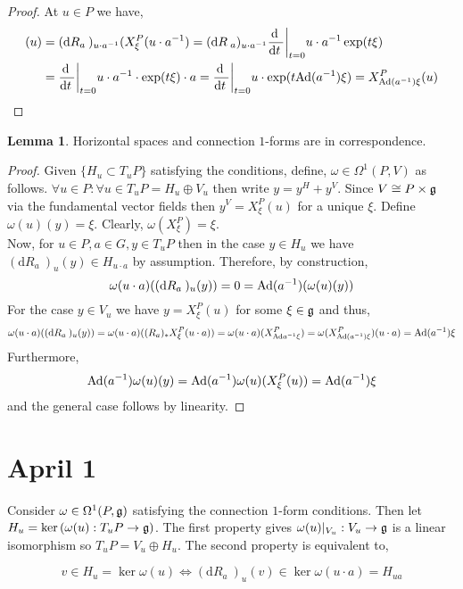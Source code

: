 \documentclass[12pt]{extarticle}
\renewcommand{\d}[1]{ \mathrm{d}#1 \:}
\newcommand{\deriv}[2]{\frac{\d{#1}}{\d{#2}}}
\theoremstyle{definition}
\newtheorem{lemma}[theorem]{Lemma}
\begin{document}
\begin{proof}
At $u \in P$ we have,
\begin{align*}
[(R_a)_* X^P_\xi](u) & = (\d{R_a})_{u \cdot a^{-1}}(X^P_\xi(u \cdot a^{-1}) = (\d{R}_a)_{u \cdot a^{-1}} \deriv{}{t} \bigg|_{t = 0} u \cdot a^{-1} \exp(t \xi)
\\
& = \deriv{}{t} \bigg|_{t = 0} u \cdot a^{-1} \cdot \exp(t \xi) \cdot a = \deriv{}{t} \bigg|_{t = 0} u \cdot \exp(t \Ad(a^{-1}) \xi) = X^P_{\Ad(a^{-1}) \xi}(u) 
\end{align*}
\end{proof}

\begin{lemma}
Horizontal spaces and connection $1$-forms are in correspondence.
\end{lemma}

\begin{proof}
Given $\{ H_u \subset T_u P \}$ satisfying the conditions, define, $\omega \in \Omega^1(P, V)$ as follows. $\forall u \in P : \forall u \in T_u P = H_u \oplus V_u$ then write $y = y^H + y^V$. Since $V \cong P \times \mathfrak{g}$ via the fundamental vector fields then $y^V = X_\xi^P(u)$ for a unique $\xi$. Define $\omega(u)(y) = \xi$. Clearly, $\omega(X^P_\xi) = \xi$.
\bigskip\\
Now, for $u \in P, a \in G, y \in T_u P$ then in the case $y \in H_u$ we have $(\d{R_a})_u(y) \in H_{u \cdot a}$ by assumption. Therefore, by construction,
\[ \omega(u \cdot a)((\d{R_a})_u(y)) = 0 = \Ad(a^{-1})(\omega(u)(y)) \]
For the case $y \in V_u$ we have $y = X^P_\xi(u)$ for some $\xi \in \mathfrak{g}$ and thus,
\[ \omega(u \cdot a)((\d{R_a})_u (y)) = \omega(u \cdot a)((R_a)_* X^P_\xi(u \cdot a)) = \omega(u \cdot a)(X^P_{\Ad{a^{-1}} \xi}) = \omega(X^P_{\Ad(a^{-1}) \xi})(u \cdot a) = \Ad(a^{-1}) \xi \]
Furthermore,
\[ \mathrm{Ad}(a^{-1}) \omega(u)(y) = \mathrm{Ad}(a^{-1}) \omega(u)(X^P_{\xi}(u)) = \mathrm{Ad}(a^{-1}) \xi \]
and the general case follows by linearity. 
\end{proof}

\section{April 1}

Consider $\omega \in \Omega^1(P, \mathfrak{g})$ satisfying the connection $1$-form conditions. Then let $H_u = \ker{(\omega(u) : T_u P \to \mathfrak{g})}$. The first property gives $\omega(u)|_{V_u} : V_u \to \mathfrak{g}$ is a linear isomorphism so $T_u P = V_u \oplus H_u$. The second property is equivalent to,
\begin{center}
\end{center}
\[ v \in H_u = \ker{\omega(u)} \iff (\d{R_a})_u(v) \in \ker{\omega(u \cdot a)} = H_{ua} \]
\end{document}
